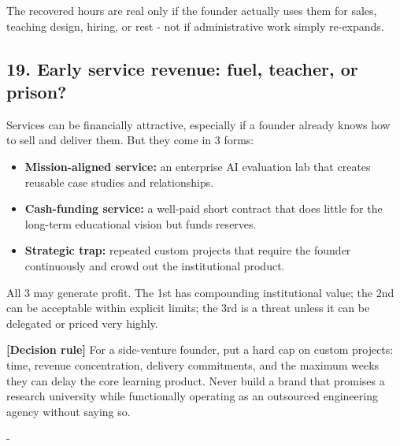 The recovered hours are real only if the founder actually uses them for sales, teaching design, hiring, or rest - not if administrative work simply re-expands.

\subsection{19. Early service revenue: fuel, teacher, or prison?}

Services can be financially attractive, especially if a founder already knows how to sell and deliver them. But they come in 3 forms:

\begin{itemize}[leftmargin=*,itemsep=1.5pt]
  \item \textbf{Mission-aligned service:} an enterprise AI evaluation lab that creates reusable case studies and relationships.
  \item \textbf{Cash-funding service:} a well-paid short contract that does little for the long-term educational vision but funds reserves.
  \item \textbf{Strategic trap:} repeated custom projects that require the founder continuously and crowd out the institutional product.
\end{itemize}

All 3 may generate profit. The 1st has compounding institutional value; the 2nd can be acceptable within explicit limits; the 3rd is a threat unless it can be delegated or priced very highly.

\textbf{\textbf{[Decision rule]}} For a side-venture founder, put a hard cap on custom projects: time, revenue concentration, delivery commitments, and the maximum weeks they can delay the core learning product. Never build a brand that promises a research university while functionally operating as an outsourced engineering agency without saying so.

-


